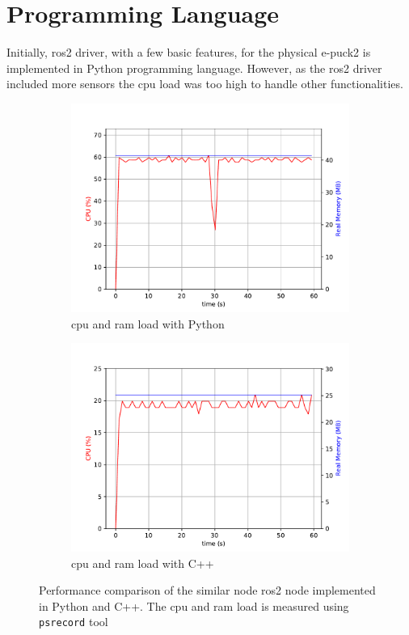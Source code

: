 
\section{Programming Language}
Initially, \ac{ros2} driver, with a few basic features, for the physical e-puck2 is implemented in Python programming language.
However, as the \ac{ros2} driver included more sensors the \ac{cpu} load was too high to handle other functionalities. 

\begin{figure}[H]
\centering
\begin{subfigure}{.8\textwidth}
  \centering
  \includegraphics[width=\linewidth]{physical/figures/rpi_py_32ms}
  \caption{\ac{cpu} and \ac{ram} load with Python}
  \label{fig:physical:py_vs_cpp:py}
\end{subfigure}
\begin{subfigure}{.8\textwidth}
  \centering
  \includegraphics[width=\linewidth]{physical/figures/rpi_cpp_32ms}
  \caption{\ac{cpu} and \ac{ram} load with C++}
  \label{fig:physical:py_vs_cpp:cpp}
\end{subfigure}
\caption[Performance comparison of implementations in Python and C++]{Performance comparison of the similar node \ac{ros2} node implemented in Python and C++. The \ac{cpu} and \ac{ram} load is measured using \texttt{psrecord} tool\footnotemark}
\label{fig:physical:py_vs_cpp}
\end{figure}
